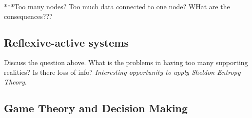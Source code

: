 \documentclass[a4paper, 12pt]{article}
\begin{document}
***Too many nodes? Too much data connected to one node? WHat are the consequences???

\subsection{Reflexive-active systems}

Discuss the question above. What is the problems in having too many supporting realities? Is there loss of info? \textit{Interesting opportunity to apply Sheldon Entropy Theory}.

\subsection{Game Theory and Decision Making}
\end{document}
